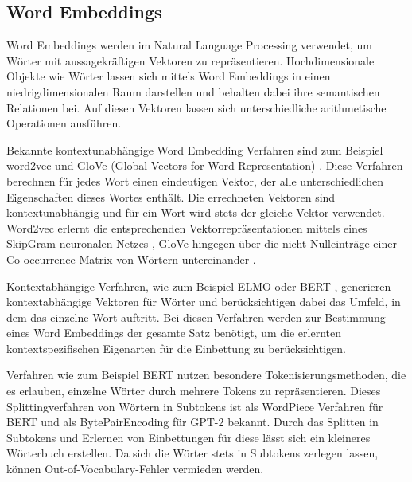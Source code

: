 \subsection{Word Embeddings}
Word Embeddings werden im Natural Language Processing verwendet, um Wörter mit aussagekräftigen Vektoren zu repräsentieren. 
Hochdimensionale Objekte wie Wörter lassen sich mittels Word Embeddings in einen niedrigdimensionalen Raum darstellen und behalten dabei ihre semantischen Relationen bei. 
Auf diesen Vektoren lassen sich unterschiedliche arithmetische Operationen ausführen.

Bekannte kontextunabhängige Word Embedding Verfahren sind zum Beispiel word2vec \citep{word2vec} und GloVe (Global Vectors for Word Representation) \citep{glove}. 
Diese Verfahren berechnen für jedes Wort einen eindeutigen Vektor, der alle unterschiedlichen Eigenschaften dieses Wortes enthält.
Die errechneten Vektoren sind kontextunabhängig und für ein Wort wird stets der gleiche Vektor verwendet. 
Word2vec erlernt die entsprechenden Vektorrepräsentationen mittels eines SkipGram neuronalen Netzes \citep{word2vec}, GloVe hingegen über die nicht Nulleinträge einer Co-occurrence Matrix von Wörtern untereinander \citep{glove}. 

Kontextabhängige Verfahren, wie zum Beispiel ELMO \citep{elmo} oder BERT \citep{DBLP:journals/corr/abs-1810-04805}, generieren kontextabhängige Vektoren für Wörter und berücksichtigen dabei das Umfeld, in dem das einzelne Wort auftritt.
Bei diesen Verfahren werden zur Bestimmung eines Word Embeddings der gesamte Satz benötigt, um die erlernten kontextspezifischen Eigenarten für die Einbettung zu berücksichtigen. 

Verfahren wie zum Beispiel BERT nutzen besondere Tokenisierungsmethoden, die es erlauben, einzelne Wörter durch mehrere Tokens zu repräsentieren.
Dieses Splittingverfahren von Wörtern in Subtokens ist als WordPiece Verfahren \citep{wordpiece} für BERT und als BytePairEncoding \citep{bytepairencoding} für GPT-2 bekannt. 
Durch das Splitten in Subtokens und Erlernen von Einbettungen für diese lässt sich ein kleineres Wörterbuch erstellen. 
Da sich die Wörter stets in Subtokens zerlegen lassen, können Out-of-Vocabulary-Fehler vermieden werden.

